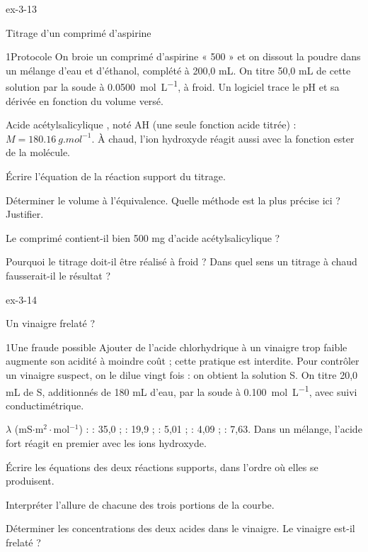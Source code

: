\begin{blocLivre}{ex-3-13}
\begin{exercice}[3]{Titrage d'un comprimé d'aspirine}
\begin{docu}{1}{Protocole}
On broie un comprimé d'aspirine « 500 » et on dissout la poudre dans un mélange d'eau et d'éthanol, complété à
200,0 mL. On titre 50,0 mL de cette solution par la soude à \qty{0,0500}{mol.L^{-1}}, à froid. Un logiciel trace
le pH et sa dérivée en fonction du volume versé.
\end{docu}
\begin{donnees}
Acide acétylsalicylique , noté AH (une seule fonction acide titrée) : $M=\qty{180,16}{g.mol^{-1}}$.
À chaud, l'ion hydroxyde réagit aussi avec la fonction ester de la molécule.
\end{donnees}
\begin{questions}
\item Écrire l'équation de la réaction support du titrage.
\item Déterminer le volume à l'équivalence. Quelle méthode est la plus précise ici ? Justifier.
\item \initiative Le comprimé contient-il bien 500 mg d'acide acétylsalicylique ?
\item Pourquoi le titrage doit-il être réalisé à froid ? Dans quel sens un titrage à chaud fausserait-il le résultat ?
\end{questions}
\end{exercice}
\end{blocLivre}
\begin{blocLivre}{ex-3-14}
\begin{exercice}[3]{Un vinaigre frelaté ?}
\begin{docu}{1}{Une fraude possible}
Ajouter de l'acide chlorhydrique à un vinaigre trop faible augmente son acidité à moindre coût ; cette pratique est
interdite. Pour contrôler un vinaigre suspect, on le dilue vingt fois : on obtient la solution S. On titre 20,0 mL de
S, additionnés de 180 mL d'eau, par la soude à \qty{0,100}{mol.L^{-1}}, avec suivi conductimétrique.
\end{docu}
\begin{donnees}
$\lambda$ (mS$\cdot$m$^2\cdot$mol$^{-1}$) :  : 35,0 ;  : 19,9 ;  : 5,01 ;  : 4,09 ;
 : 7,63. Dans un mélange, l'acide fort réagit en premier avec les ions hydroxyde.
\end{donnees}
\begin{questions}
\item Écrire les équations des deux réactions supports, dans l'ordre où elles se produisent.
\item Interpréter l'allure de chacune des trois portions de la courbe.
\item \initiative Déterminer les concentrations des deux acides dans le vinaigre. Le vinaigre est-il frelaté ?
\end{questions}
\end{exercice}
\end{blocLivre}
